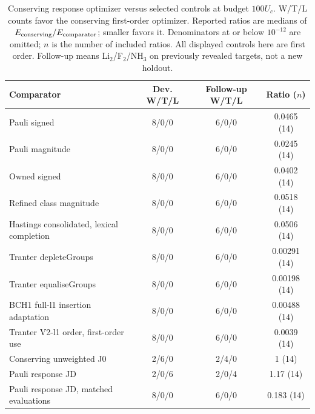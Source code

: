 \begin{table}[htbp]
\centering
\small
\caption{Conserving response optimizer versus selected controls at budget $100U_c$. W/T/L counts favor the conserving first-order optimizer. Reported ratios are medians of $E_{\rm conserving}/E_{\rm comparator}$; smaller favors it. Denominators at or below $10^{-12}$ are omitted; $n$ is the number of included ratios. All displayed controls here are first order. Follow-up means Li$_2$/F$_2$/NH$_3$ on previously revealed targets, not a new holdout.}
\label{tab:expanded-headline}
\begin{tabular}{p{}ccc}
\toprule
Comparator & Dev. W/T/L & Follow-up W/T/L & Ratio ($n$)\\
\midrule
Pauli signed & 8/0/0 & 6/0/0 & 0.0465 (14)\\
Pauli magnitude & 8/0/0 & 6/0/0 & 0.0245 (14)\\
Owned signed & 8/0/0 & 6/0/0 & 0.0402 (14)\\
Refined class magnitude & 8/0/0 & 6/0/0 & 0.0518 (14)\\
Hastings consolidated, lexical completion & 8/0/0 & 6/0/0 & 0.0506 (14)\\
Tranter depleteGroups & 8/0/0 & 6/0/0 & 0.00291 (14)\\
Tranter equaliseGroups & 8/0/0 & 6/0/0 & 0.00198 (14)\\
BCH1 full-l1 insertion adaptation & 8/0/0 & 6/0/0 & 0.00488 (14)\\
Tranter V2-l1 order, first-order use & 8/0/0 & 6/0/0 & 0.0039 (14)\\
Conserving unweighted J0 & 2/6/0 & 2/4/0 & 1 (14)\\
Pauli response JD & 2/0/6 & 2/0/4 & 1.17 (14)\\
Pauli response JD, matched evaluations & 8/0/0 & 6/0/0 & 0.183 (14)\\
\bottomrule
\end{tabular}
\end{table}
